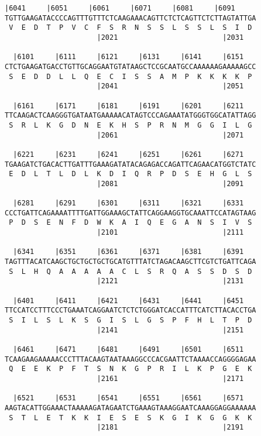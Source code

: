 \documentclass{article}
\begin{document}
\newpage
\begin{Verbatim}[fontfamily=courier]
  |6041     |6051     |6061     |6071     |6081     |6091   
TGTTGAAGATACCCCAGTTTGTTTCTCAAGAAACAGTTCTCTCAGTTCTCTTAGTATTGA
 V  E  D  T  P  V  C  F  S  R  N  S  S  L  S  S  L  S  I  D 
                      |2021                         |2031   

  |6101     |6111     |6121     |6131     |6141     |6151   
CTCTGAAGATGACCTGTTGCAGGAATGTATAAGCTCCGCAATGCCAAAAAAGAAAAAGCC
 S  E  D  D  L  L  Q  E  C  I  S  S  A  M  P  K  K  K  K  P 
                      |2041                         |2051   

  |6161     |6171     |6181     |6191     |6201     |6211   
TTCAAGACTCAAGGGTGATAATGAAAAACATAGTCCCAGAAATATGGGTGGCATATTAGG
 S  R  L  K  G  D  N  E  K  H  S  P  R  N  M  G  G  I  L  G 
                      |2061                         |2071   

  |6221     |6231     |6241     |6251     |6261     |6271   
TGAAGATCTGACACTTGATTTGAAAGATATACAGAGACCAGATTCAGAACATGGTCTATC
 E  D  L  T  L  D  L  K  D  I  Q  R  P  D  S  E  H  G  L  S 
                      |2081                         |2091   

  |6281     |6291     |6301     |6311     |6321     |6331   
CCCTGATTCAGAAAATTTTGATTGGAAAGCTATTCAGGAAGGTGCAAATTCCATAGTAAG
 P  D  S  E  N  F  D  W  K  A  I  Q  E  G  A  N  S  I  V  S 
                      |2101                         |2111   

  |6341     |6351     |6361     |6371     |6381     |6391   
TAGTTTACATCAAGCTGCTGCTGCTGCATGTTTATCTAGACAAGCTTCGTCTGATTCAGA
 S  L  H  Q  A  A  A  A  A  C  L  S  R  Q  A  S  S  D  S  D 
                      |2121                         |2131   

  |6401     |6411     |6421     |6431     |6441     |6451   
TTCCATCCTTTCCCTGAAATCAGGAATCTCTCTGGGATCACCATTTCATCTTACACCTGA
 S  I  L  S  L  K  S  G  I  S  L  G  S  P  F  H  L  T  P  D 
                      |2141                         |2151   

  |6461     |6471     |6481     |6491     |6501     |6511   
TCAAGAAGAAAAACCCTTTACAAGTAATAAAGGCCCACGAATTCTAAAACCAGGGGAGAA
 Q  E  E  K  P  F  T  S  N  K  G  P  R  I  L  K  P  G  E  K 
                      |2161                         |2171   

  |6521     |6531     |6541     |6551     |6561     |6571   
AAGTACATTGGAAACTAAAAAGATAGAATCTGAAAGTAAAGGAATCAAAGGAGGAAAAAA
 S  T  L  E  T  K  K  I  E  S  E  S  K  G  I  K  G  G  K  K 
                      |2181                         |2191   

\end{Verbatim}
\end{document}
